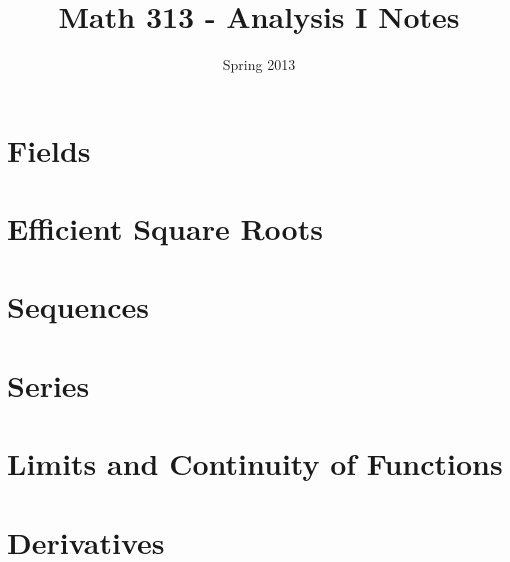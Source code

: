 \documentclass[12pt, letterpaper]{article}
\theoremstyle{break}
\begin{document}
\title{Math 313 - Analysis I Notes}	
\author{Spring 2013} 
\maketitle


\section{Fields}


\section{Efficient Square Roots}

\section{Sequences}


\section{Series}

\section{Limits and Continuity of Functions}


\section{Derivatives}

 
\end{document}
